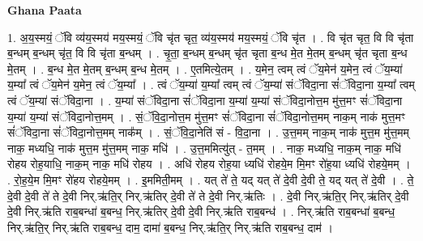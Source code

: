 \documentclass[17pt]{extarticle}
\begin{document}
\textbf{Ghana Paata } \newline

1. अ॒य॒स्मयं॒ ॅवि व्य॑य॒स्मय॑ मय॒स्मयं॒ ॅवि चृ॑त चृत॒ व्य॑य॒स्मय॑ मय॒स्मयं॒ ॅवि चृ॑त । . वि चृ॑त चृत॒ वि वि चृ॑ता ब॒न्धम् ब॒न्धम् चृ॑त॒ वि वि चृ॑ता ब॒न्धम् । . चृ॒ता॒ ब॒न्धम् ब॒न्धम् चृ॑त चृता ब॒न्ध मे॒त मे॒तम् ब॒न्धम् चृ॑त चृता ब॒न्ध मे॒तम् । . ब॒न्ध मे॒त मे॒तम् ब॒न्धम् ब॒न्ध मे॒तम् । . ए॒तमित्ये॒तम् । . य॒मेन॒ त्वम् त्वं ॅय॒मेन॑ य॒मेन॒ त्वं ॅय॒म्या॑ य॒म्या᳚ त्वं ॅय॒मेन॑ य॒मेन॒ त्वं ॅय॒म्या᳚ । . त्वं ॅय॒म्या॑ य॒म्या᳚ त्वम् त्वं ॅय॒म्या॑ संॅविदा॒ना सं॑ॅविदा॒ना य॒म्या᳚ त्वम् त्वं ॅय॒म्या॑ संॅविदा॒ना । . य॒म्या॑ संॅविदा॒ना सं॑ॅविदा॒ना य॒म्या॑ य॒म्या॑ संॅविदा॒नोत्त॒म मु॑त्त॒मꣳ सं॑ॅविदा॒ना य॒म्या॑ य॒म्या॑ संॅविदा॒नोत्त॒मम् । . सं॒ॅवि॒दा॒नोत्त॒म मु॑त्त॒मꣳ सं॑ॅविदा॒ना सं॑ॅविदा॒नोत्त॒मम् नाक॒म् नाक॑ मुत्त॒मꣳ सं॑ॅविदा॒ना सं॑ॅविदा॒नोत्त॒मम् नाक᳚म् । . सं॒ॅवि॒दा॒नेति॑ सं - वि॒दा॒ना । . उ॒त्त॒मम् नाक॒म् नाक॑ मुत्त॒म मु॑त्त॒मम् नाक॒ मध्यधि॒ नाक॑ मुत्त॒म मु॑त्त॒मम् नाक॒ मधि॑ । . उ॒त्त॒ममित्यु॑त् - त॒मम् । . नाक॒ मध्यधि॒ नाक॒म् नाक॒ मधि॑ रोहय रोह॒याधि॒ नाक॒म् नाक॒ मधि॑ रोहय । . अधि॑ रोहय रोह॒या ध्यधि॑ रोहये॒म मि॒मꣳ रो॑ह॒या ध्यधि॑ रोहये॒मम् । . रो॒ह॒ये॒म मि॒मꣳ रो॑हय रोहये॒मम् । . इ॒ममिती॒मम् । . यत् ते॑ ते॒ यद् यत् ते॑ दे॒वी दे॒वी ते॒ यद् यत् ते॑ दे॒वी । . ते॒ दे॒वी दे॒वी ते॑ ते दे॒वी निर्.ऋ॑ति॒र् निर्.ऋ॑तिर् दे॒वी ते॑ ते दे॒वी निर्.ऋ॑तिः । . दे॒वी निर्.ऋ॑ति॒र् निर्.ऋ॑तिर् दे॒वी दे॒वी निर्.ऋ॑ति राब॒बन्धा॑ ब॒बन्ध॒ निर्.ऋ॑तिर् दे॒वी दे॒वी निर्.ऋ॑ति राब॒बन्ध॑ । . निर्.ऋ॑ति राब॒बन्धा॑ ब॒बन्ध॒ निर्.ऋ॑ति॒र् निर्.ऋ॑ति राब॒बन्ध॒ दाम॒ दामा॑ ब॒बन्ध॒ निर्.ऋ॑ति॒र् निर्.ऋ॑ति राब॒बन्ध॒ दाम॑ । \newline
\end{document}
